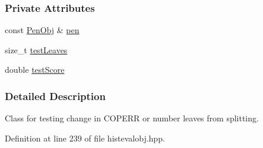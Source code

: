 \subsubsection*{\-Private \-Attributes}
\begin{DoxyCompactItemize}
\item 
const \hyperlink{classsubpavings_1_1PenObj}{\-Pen\-Obj} \& \hyperlink{classsubpavings_1_1CritCOPERRChangeOrLeaves__GTE_aace4dfbb6cd41e2d27ded2e340f445bd}{pen}
\item 
size\-\_\-t \hyperlink{classsubpavings_1_1CritCOPERRChangeOrLeaves__GTE_a11be9290c3893dab1f64af62b4482a18}{test\-Leaves}
\item 
double \hyperlink{classsubpavings_1_1CritCOPERRChangeOrLeaves__GTE_a2743d2cdbbd6042afda9450aa97a7e2b}{test\-Score}
\end{DoxyCompactItemize}


\subsubsection{\-Detailed \-Description}
\-Class for testing change in \-C\-O\-P\-E\-R\-R or number leaves from splitting. 

\-Definition at line 239 of file histevalobj.\-hpp.



